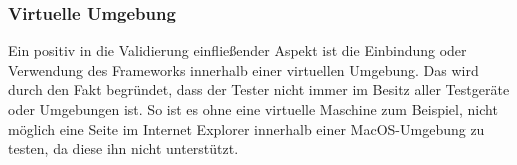 	\subsubsection{Virtuelle Umgebung}
	Ein positiv in die Validierung einfließender Aspekt ist die Einbindung oder Verwendung des \Gls{Framework}s innerhalb einer virtuellen Umgebung. Das wird durch den Fakt begründet, dass der Tester nicht immer im Besitz aller Testgeräte oder Umgebungen ist. So ist es ohne eine virtuelle Maschine zum Beispiel, nicht möglich eine Seite im Internet Explorer innerhalb einer MacOS-Umgebung zu testen, da diese ihn nicht unterstützt.

